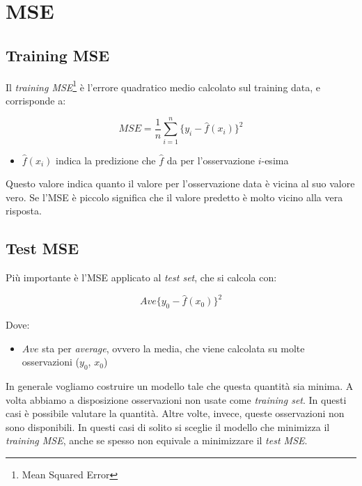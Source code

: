 \section{MSE}

\subsection{Training MSE}
Il \textit{training MSE}\footnote{Mean Squared Error} \`e l'errore quadratico 
medio calcolato sul training data, e corrisponde a:

\[ MSE = \frac{1}{n} \sum_{i=1}^n \{y_i - \hat{f}(x_i)\}^2 \]

\begin{itemize}
 \item $\hat{f}(x_i)$ indica la predizione che $\hat{f}$ da per l'osservazione 
$i$-esima
\end{itemize}


Questo valore indica quanto il valore per l'osservazione data \`e vicina al suo 
valore vero. Se l'MSE \`e piccolo significa che il valore predetto \`e molto 
vicino alla vera risposta.

\subsection{Test MSE}

Pi\`u importante \`e l'MSE applicato al \textit{test set}, che si calcola con:

\[ Ave\{y_0 - \hat{f}(x_0)\}^2 \]

Dove:
\begin{itemize}
 \item $Ave$ sta per \textit{average}, ovvero la media, che viene calcolata su 
molte osservazioni ($y_0$, $x_0$)
\end{itemize}

In generale vogliamo costruire un modello tale che questa quantit\`a sia minima. A volta abbiamo a disposizione osservazioni non usate come \textit{training set}. In questi casi \`e possibile valutare la quantit\`a. Altre volte, invece, queste osservazioni non sono disponibili. In questi casi di solito si sceglie il modello che minimizza il \textit{training MSE}, anche se spesso non equivale a minimizzare il \textit{test MSE}.